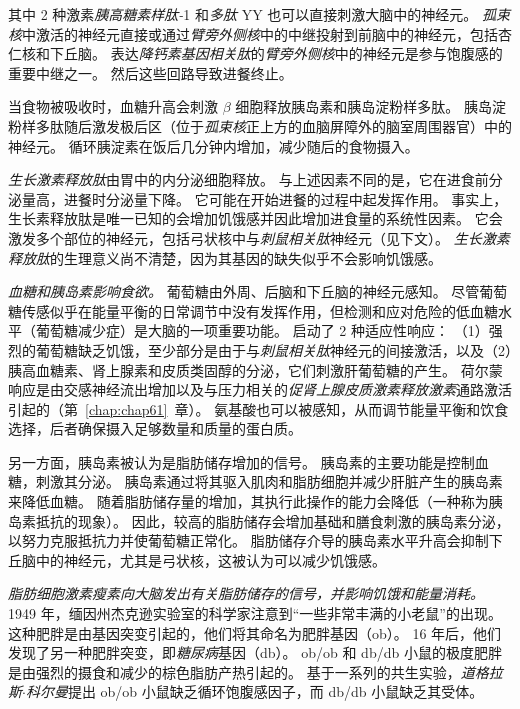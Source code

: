 其中 2 种激素\textit{胰高糖素样肽-}1 和\textit{多肽 }YY 也可以直接刺激大脑中的神经元。
\textit{孤束核}中激活的神经元直接或通过\textit{臂旁外侧核}中的中继投射到前脑中的神经元，包括杏仁核和下丘脑。
表达\textit{降钙素基因相关肽}的\textit{臂旁外侧核}中的神经元是参与饱腹感的重要中继之一。
然后这些回路导致进餐终止。


当食物被吸收时，血糖升高会刺激 $ \beta $ 细胞释放胰岛素和胰岛淀粉样多肽。
胰岛淀粉样多肽随后激发极后区（位于\textit{孤束核}正上方的血脑屏障外的脑室周围器官）中的神经元。
循环胰淀素在饭后几分钟内增加，减少随后的食物摄入。


\textit{生长激素释放肽}由胃中的内分泌细胞释放。
与上述因素不同的是，它在进食前分泌量高，进餐时分泌量下降。
它可能在开始进餐的过程中起发挥作用。
事实上，生长素释放肽是唯一已知的会增加饥饿感并因此增加进食量的系统性因素。
它会激发多个部位的神经元，包括弓状核中与\textit{刺鼠相关肽}神经元（见下文）。
\textit{生长激素释放肽}的生理意义尚不清楚，因为其基因的缺失似乎不会影响饥饿感。


\textit{血糖和胰岛素影响食欲。}
葡萄糖由外周、后脑和下丘脑的神经元感知。
尽管葡萄糖传感似乎在能量平衡的日常调节中没有发挥作用，但检测和应对危险的低血糖水平（葡萄糖减少症）是大脑的一项重要功能。
启动了 2 种适应性响应：
（1）强烈的葡萄糖缺乏饥饿，至少部分是由于与\textit{刺鼠相关肽}神经元的间接激活，以及（2）胰高血糖素、肾上腺素和皮质类固醇的分泌，它们刺激肝葡萄糖的产生。
荷尔蒙响应是由交感神经流出增加以及与压力相关的\textit{促肾上腺皮质激素释放激素}通路激活引起的（第~\ref{chap:chap61}~章）。
氨基酸也可以被感知，从而调节能量平衡和饮食选择，后者确保摄入足够数量和质量的蛋白质。


另一方面，胰岛素被认为是脂肪储存增加的信号。
胰岛素的主要功能是控制血糖，刺激其分泌。
胰岛素通过将其驱入肌肉和脂肪细胞并减少肝脏产生的胰岛素来降低血糖。
随着脂肪储存量的增加，其执行此操作的能力会降低（一种称为胰岛素抵抗的现象）。
因此，较高的脂肪储存会增加基础和膳食刺激的胰岛素分泌，以努力克服抵抗力并使葡萄糖正常化。
脂肪储存介导的胰岛素水平升高会抑制下丘脑中的神经元，尤其是弓状核，这被认为可以减少饥饿感。


\textit{脂肪细胞激素瘦素向大脑发出有关脂肪储存的信号，并影响饥饿和能量消耗。}
1949 年，缅因州杰克逊实验室的科学家注意到“一些非常丰满的小老鼠”的出现。
这种肥胖是由基因突变引起的，他们将其命名为肥胖基因（ob）。
16 年后，他们发现了另一种肥胖突变，即\textit{糖尿病}基因（db）。
ob/ob 和 db/db 小鼠的极度肥胖是由强烈的摄食和减少的棕色脂肪产热引起的。
基于一系列的共生实验，\textit{道格拉斯$\cdot$科尔曼}提出 ob/ob 小鼠缺乏循环饱腹感因子，而 db/db 小鼠缺乏其受体。



